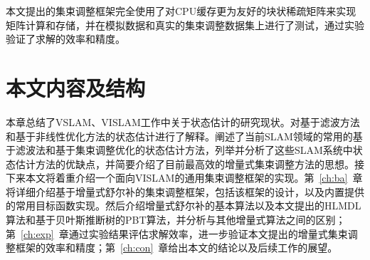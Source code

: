本文提出的集束调整框架完全使用了对CPU缓存更为友好的块状稀疏矩阵来实现矩阵计算和存储，并在模拟数据和真实的集束调整数据集上进行了测试，通过实验验证了求解的效率和精度。




\section{本文内容及结构}

本章总结了VSLAM、VISLAM工作中关于状态估计的研究现状。对基于滤波方法和基于非线性优化方法的状态估计进行了解释。阐述了当前SLAM领域的常用的基于滤波法和基于集束调整优化的状态估计方法，列举并分析了这些SLAM系统中状态估计方法的优缺点，并简要介绍了目前最高效的增量式集束调整方法的思想。接下来本文将着重介绍一个面向VISLAM的通用集束调整框架的实现。第~\ref{ch:ba}~章将详细介绍基于增量式舒尔补的集束调整框架，包括该框架的设计，以及内置提供的常用目标函数实现。然后介绍增量式舒尔补的基本算法以及本文提出的HLMDL算法和基于贝叶斯推断树的PBT算法，并分析与其他增量式算法之间的区别；第~\ref{ch:exp}~章通过实验结果评估求解效率，进一步验证本文提出的增量式集束调整框架的效率和精度；第~\ref{ch:con}~章给出本文的结论以及后续工作的展望。
